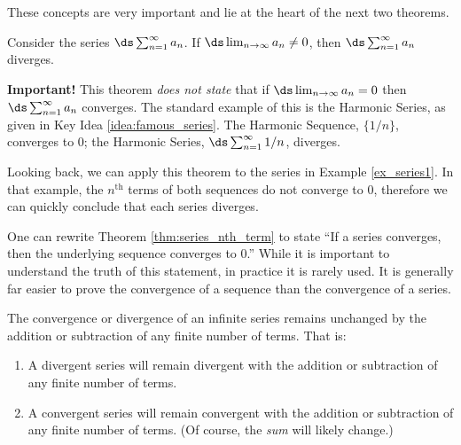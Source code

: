 These concepts are very important and lie at the heart of the next two theorems.

{Consider the series $\ds\sum_{n=1}^\infty a_n$. If $\ds \lim_{n\to\infty}a_n \neq 0$, then $\ds\sum_{n=1}^\infty a_n$ diverges.
}

\textbf{Important!} This theorem \emph{does not state} that if $\ds \lim_{n\to\infty} a_n = 0$ then $\ds \sum_{n=1}^\infty  a_n $ converges. The standard example of this is the Harmonic Series, as given in Key Idea \ref{idea:famous_series}. The Harmonic Sequence, $\{1/n\}$, converges to 0; the Harmonic Series, $\ds \sum_{n=1}^\infty 1/n$, diverges.


Looking back, we can apply this theorem to the series in Example \ref{ex_series1}. In that example, the $n^\text{th}$ terms of both sequences do not converge to 0, therefore we can quickly conclude that each series diverges.

One can rewrite Theorem \ref{thm:series_nth_term} to state ``If a series converges, then the underlying sequence converges to 0.'' While it is important to understand the truth of this statement, in practice it is rarely used. It is generally far easier to prove the convergence of a sequence than the convergence of a series. 



{The convergence or divergence of an infinite series remains unchanged by the addition or subtraction of any finite number of terms. That is:
	\begin{enumerate}
	\item		A divergent series will remain divergent with the addition or subtraction of any finite number of terms.
	\item		A convergent series will remain convergent with the addition or subtraction of any finite number of terms. (Of course, the \emph{sum} will likely change.)
	\end{enumerate}
}

